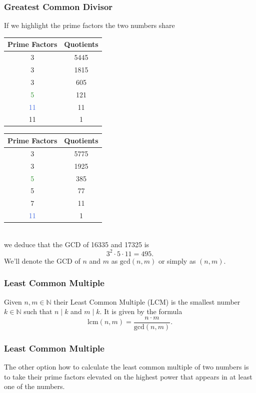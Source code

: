 \documentclass[aspectratio=169,11pt,usenames,dvipsnames,handout]{beamer}
\newcommand{\clr}{\textcolor{BrickRed}}
\newcommand{\clb}{\textcolor{RoyalBlue}}
\newcommand{\clg}{\textcolor{ForestGreen}}
\newcommand{\N}{\mathbb{N}}
\begin{document}
\begin{frame}
 \frametitle{Greatest Common Divisor}
 If we highlight the prime factors the two numbers share\\
 \vspace{1em}
 \begin{minipage}{.48\textwidth}
  \centering
   \begin{tabular}{c|c}
    \textbf{Prime Factors} & \textbf{Quotients}\\
    \toprule
    \clr{3} & 5445\\
    \clr{3} & 1815\\
    3 & 605\\
    \clg{5} & 121\\
    \clb{11} & 11\\
    11 & 1
  \end{tabular}
 \end{minipage}
 \begin{minipage}{.48\textwidth}
   \begin{tabular}{c|c}
    \textbf{Prime Factors} & \textbf{Quotients}\\
    \toprule
    \clr{3} & 5775\\
    \clr{3} & 1925\\
    \clg{5} & 385\\
    5 & 77\\
    7 & 11\\
    \clb{11} & 1
  \end{tabular}
 \end{minipage}\\
 \pause
 \vspace{1em}
 we deduce that the GCD of 16335 and 17325 is
 \[
  3^2 \cdot 5 \cdot 11 = 495.
 \]
 \pause
 We'll denote the GCD of $n$ and $m$ as $\mathrm{gcd}(n,m)$ or simply as
 $(n,m)$.
\end{frame}

\begin{frame}
 \frametitle{Least Common Multiple}
 \begin{tcolorbox}[title=Least Common Multiple]
  Given $n,m \in \N$ their \alert{Least Common Multiple} (LCM) is the
  \alert{smallest} number $k \in \N$ such that $n \mid k$ and $m \mid k$.
  \pause
  It is given by the formula
  \[
   \mathrm{lcm}(n,m) = \frac{n \cdot m}{\mathrm{gcd}(n,m)}.
  \]
 \end{tcolorbox}
\end{frame}

\begin{frame}
 \frametitle{Least Common Multiple}
 The other option how to calculate the least common multiple of two numbers is
 to take their prime factors elevated on the highest power that appears in at
 least one of the numbers.
\end{frame}
\end{document}

